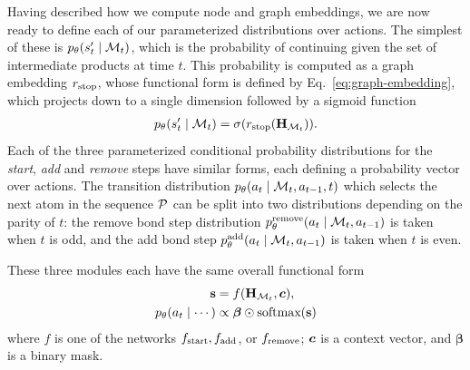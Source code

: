Having described how we compute node and graph embeddings, we are now ready to define each of our parameterized distributions over actions.
The simplest of these is $p_\theta(s'_t \mid {\mathcal{M}}_t)$, which is the probability of continuing given the set of intermediate products at time $t$. 
This probability is computed as a graph embedding $r_{\textrm{stop}}$,
whose functional form is defined by Eq.~\eqref{eq:graph-embedding}, which projects down to a single dimension followed by a sigmoid function
\begin{align}
p_\theta(s'_t \mid {\mathcal{M}}_t) = \sigma(r_{\textrm{stop}}({\mathbf{H}}_{{\mathcal{M}}_t})).
\end{align}
%
Each of the three parameterized conditional probability distributions for the {\em start}, {\em add} and {\em remove} steps have similar forms, each defining a probability vector over actions.
The transition distribution $p_\theta(a_t \mid  {\mathcal{M}}_t, a_{t-1}, t)$ 
which selects the next atom in the sequence ${\mathcal{P}}$
can be split into two distributions depending on the parity of $t$:
the remove bond step distribution $p_\theta^\textrm{remove}(a_t \mid  {\mathcal{M}}_t, a_{t-1})$ is taken when $t$ is odd, 
and the add bond step $p_\theta^\textrm{add}(a_t \mid {\mathcal{M}}_t, a_{t-1})$ is taken when $t$ is even. 

These three modules each have the same overall functional form
\begin{align}
\textbf{s} &= f({\mathbf{H}}_{{\mathcal{M}}_t}, \bm{c}), \\
p_\theta(a_t \mid \cdots) &\propto \bm{\beta} \odot \mbox{softmax}(\bm{\textbf{s}})
\end{align}
where $f$ is one of the networks $f_{\textrm{start}}, f_{\textrm{add}}$, or $f_{\textrm{remove}}$; 
$\bm{c}$ is a context vector, and $\bm{\beta}$ is a binary mask.

